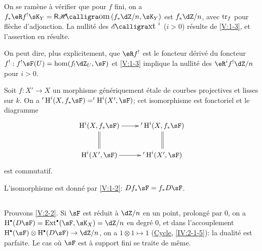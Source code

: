 On se ramène à vérifier que pour $f$ fini, on a 
$f_\ast \eR f^!\sK_Y = \rHom(f_\ast\dZ/n,\sK_Y)$ est $f_\ast\dZ/n$, avec $\operatorname{tr}_f$ 
pour flèche d'adjonction. La nullité des $\Ext^i$ ($i>0$) résulte de 
\ref{V:1-3}, et l'assertion en résulte. 

On peut dire, plus explicitement, que $\eR f^!$ est le foncteur dérivé du 
foncteur $f^!:f^!\sF(U)=\hom(f_!\dZ_U,\sF)$ et \ref{V:1-3} implique la 
nullité des $\eR^i f^!\dZ/n$ pour $i>0$.





\begin{corollary_}\label{V:2-4}
Soit $f:X'\to X$ un morphisme génériquement étale de courbes 
projectives et lisses sur $k$. On a $'\h^i(X,f_\ast \sF)='\h^i(X',\sF)$; cet 
isomorphisme est fonctoriel et le diagramme 
\[\xymatrix{
  \h^i(X,f_\ast\sF) \ar[r] \ar@{=}[d] 
    & '\h^i(X,f_\ast\sF) \ar@{=}[d] \\
  \h^i(X',\sF) \ar[r] 
    & '\h^i(X',\sF) 
}\]
est commutatif.
\end{corollary_}

L'isomorphisme est donné par \ref{V:1-2}: $D f_\ast\sF=f_\ast D\sF$. 





\subsection{}\label{V:2-5}

Prouvons \ref{V:2-2}. Si $\sF$ est réduit à $\dZ/n$ en un point, prolongé 
par $0$, on a $\h^\bullet(D\sF) = \ext^\bullet(\sF,\sK_X)=\dZ/n$ en degré 
$0$, et dans l'accouplement $\h^\bullet(\sF)\otimes\h^\bullet(D\sF) \to \dZ/n$, 
on a $1\otimes 1\mapsto 1$ (\hyperref[IV]{Cycle}, \ref{IV:2-1-5}): la dualité 
est parfaite. Le cas où $\sF$ est à support fini se traite de même. 

